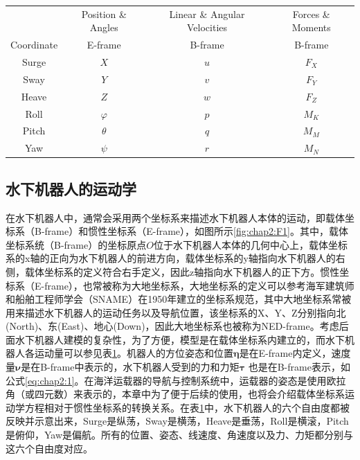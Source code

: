 \begin{table}[!hpb]
\centering
\label{tab:chap2:notation}
\begin{tabular}{cccc}
\toprule
      & Position \& Angles   &  Linear \& Angular Velocities  & Forces \& Moments \\
Coordinate & E-frame & B-frame & B-frame \\ \midrule
Surge & $X$      &  $u$ & $F_X$ \\
Sway  & $Y$      &  $v$ & $F_Y$ \\
Heave & $Z$      &  $w$ & $F_Z$ \\
Roll  & $\varphi$&  $p$ & $M_K$ \\
Pitch & $\theta$ &  $q$ & $M_M$ \\
Yaw   & $\psi$   &  $r$ & $M_N$ \\
\bottomrule
\end{tabular}
\end{table}

\subsection{水下机器人的运动学 }

在水下机器人中，通常会采用两个坐标系来描述水下机器人本体的运动，即载体坐标系（B-frame）和惯性坐标系（E-frame），如图所示\ref{fig:chap2:F1}。其中，载体坐标系统（B-frame）的坐标原点$O$位于水下机器人本体的几何中心上，载体坐标系的x轴的正向为水下机器人的前进方向，载体坐标系的y轴指向水下机器人的右侧，载体坐标系的定义符合右手定义，因此z轴指向水下机器人的正下方。惯性坐标系（E-frame），也常被称为大地坐标系，大地坐标系的定义可以参考海军建筑师和船舶工程师学会（SNAME）在1950年建立的坐标系规范，其中大地坐标系常被用来描述水下机器人的运动任务以及导航位置，该坐标系的X、Y、Z分别指向北(North)、东(East)、地心(Down)，因此大地坐标系也被称为NED-frame\cite{fossen1994guidance}。考虑后面水下机器人建模的复杂性，为了方便，模型是在载体坐标系内建立的，而水下机器人各运动量可以参见表\ref{tab:chap2:notation}。机器人的方位姿态和位置$\bm \eta$是在E-frame内定义，速度量$\bm \nu$是在B-frame中表示的，水下机器人受到的力和力矩$\bm \tau$ 也是在B-frame表示，如公式\ref{eq:chap2:1}。在海洋运载器的导航与控制系统中，运载器的姿态是使用欧拉角（或四元数）来表示的，本章中为了便于后续的使用，也将会介绍载体坐标系运动学方程相对于惯性坐标系的转换关系。在表\ref{tab:chap2:notation}中，水下机器人的六个自由度都被反映并示意出来，Surge是纵荡，Sway是横荡，Heave是垂荡，Roll是横滚，Pitch是俯仰，Yaw是偏航。所有的位置、姿态、线速度、角速度以及力、力矩都分别与这六个自由度对应。



